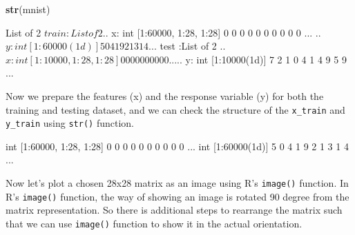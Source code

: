 \documentclass[12pt,]{krantz}
\makeatletter
\newenvironment{Shaded}{\begin{snugshade}}{\end{snugshade}}
\newcommand{\KeywordTok}[1]{\textcolor[rgb]{0.27,0.27,0.27}{\textbf{#1}}}
\newcommand{\NormalTok}[1]{#1}
\newcommand{\OperatorTok}[1]{\textcolor[rgb]{0.43,0.43,0.43}{\textbf{#1}}}
\newcommand{\StringTok}[1]{\textcolor[rgb]{0.5,0.5,0.5}{#1}}
\newenvironment{kframe}{%
\medskip{}
\setlength{\fboxsep}{.8em}
 \def\at@end@of@kframe{}%
 \ifinner\ifhmode%
  \def\at@end@of@kframe{\end{minipage}}%
  \begin{minipage}{\columnwidth}%
 \fi\fi%
 \def\FrameCommand##1{\hskip\@totalleftmargin \hskip-\fboxsep
 \colorbox{shadecolor}{##1}\hskip-\fboxsep
     \hskip-\linewidth \hskip-\@totalleftmargin \hskip\columnwidth}%
 \MakeFramed {\advance\hsize-\width
   \@totalleftmargin\z@ \linewidth\hsize
   \@setminipage}}%
 {\par\unskip\endMakeFramed%
 \at@end@of@kframe}
\renewenvironment{Shaded}{\begin{kframe}}{\end{kframe}}
\makeatother
\begin{document}
\begin{Shaded}
\begin{Highlighting}[]
\KeywordTok{str}\NormalTok{(mnist)}
\end{Highlighting}
\end{Shaded}

\begin{Shaded}
\begin{Highlighting}[]
\NormalTok{List of 2}
\NormalTok{ $ train:List of 2}
\NormalTok{  ..$ x: int [1:60000, 1:28, 1:28] 0 0 0 0 0 0 0 0 0 0 ...}
\NormalTok{  ..$ y: int [1:60000(1d)] 5 0 4 1 9 2 1 3 1 4 ...}
\NormalTok{ $ test :List of 2}
\NormalTok{  ..$ x: int [1:10000, 1:28, 1:28] 0 0 0 0 0 0 0 0 0 0 ...}
\NormalTok{  ..$ y: int [1:10000(1d)] 7 2 1 0 4 1 4 9 5 9 ...}
\end{Highlighting}
\end{Shaded}

Now we prepare the features (x) and the response variable (y) for both the training and testing dataset, and we can check the structure of the \texttt{x\_train} and \texttt{y\_train} using \texttt{str()} function.

\begin{Shaded}
\end{Shaded}

\begin{Shaded}
\begin{Highlighting}[]
\NormalTok{int [1:60000, 1:28, 1:28] 0 0 0 0 0 0 0 0 0 0 ...}
\NormalTok{int [1:60000(1d)] 5 0 4 1 9 2 1 3 1 4 ...}
\end{Highlighting}
\end{Shaded}

Now let's plot a chosen 28x28 matrix as an image using R's \texttt{image()} function. In R's \texttt{image()} function, the way of showing an image is rotated 90 degree from the matrix representation. So there is additional steps to rearrange the matrix such that we can use \texttt{image()} function to show it in the actual orientation.
\end{document}
